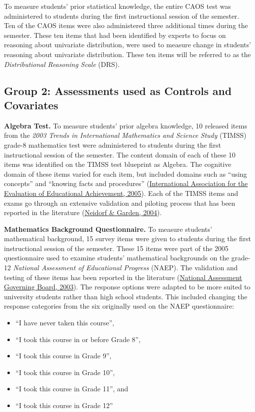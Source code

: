 \documentclass[11pt]{umnthesis}
\begin{document}
To measure students' prior statistical knowledge, the entire CAOS test was administered to students during the first instructional session of the semester. Ten of the CAOS items were also administered three additional times during the semester. These ten items that had been identified by experts to focus on reasoning about univariate distribution, were used to measure change in students' reasoning about univariate distribution. These ten items will be referred to as the \emph{Distributional Reasoning Scale} (DRS).

\hypertarget{assess-covar}{%
\subsection{Group 2: Assessments used as Controls and Covariates}\label{assess-covar}}

\textbf{Algebra Test.} To measure students' prior algebra knowledge, 10 released items from the \emph{2003 Trends in International Mathematics and Science Study} (TIMSS) grade-8 mathematics test were administered to students during the first instructional session of the semester. The content domain of each of these 10 items was identified on the TIMSS test blueprint as Algebra. The cognitive domain of these items varied for each item, but included domains such as ``using concepts'' and ``knowing facts and procedures'' (\protect\hyperlink{ref-iaeea:2005}{International Association for the Evaluation of Educational Achievement, 2005}). Each of the TIMSS items and exams go through an extensive validation and piloting process that has been reported in the literature (\protect\hyperlink{ref-neidorf:2004}{Neidorf \& Garden, 2004}).

\textbf{Mathematics Background Questionnaire.} To measure students' mathematical background, 15 survey items were given to students during the first instructional session of the semester. These 15 items were part of the 2005 questionnaire used to examine students' mathematical backgrounds on the grade-12 \emph{National Assessment of Educational Progress} (NAEP). The validation and testing of these items has been reported in the literature (\protect\hyperlink{ref-nagb:2003}{National Assessment Governing Board, 2003}). The response options were adapted to be more suited to university students rather than high school students. This included changing the response categories from the six originally used on the NAEP questionnaire:

\begin{itemize}
\tightlist
\item
  ``I have never taken this course'',
\item
  ``I took this course in or before Grade 8'',
\item
  ``I took this course in Grade 9'',
\item
  ``I took this course in Grade 10'',
\item
  ``I took this course in Grade 11'', and
\item
  ``I took this course in Grade 12''
\end{itemize}
\end{document}
